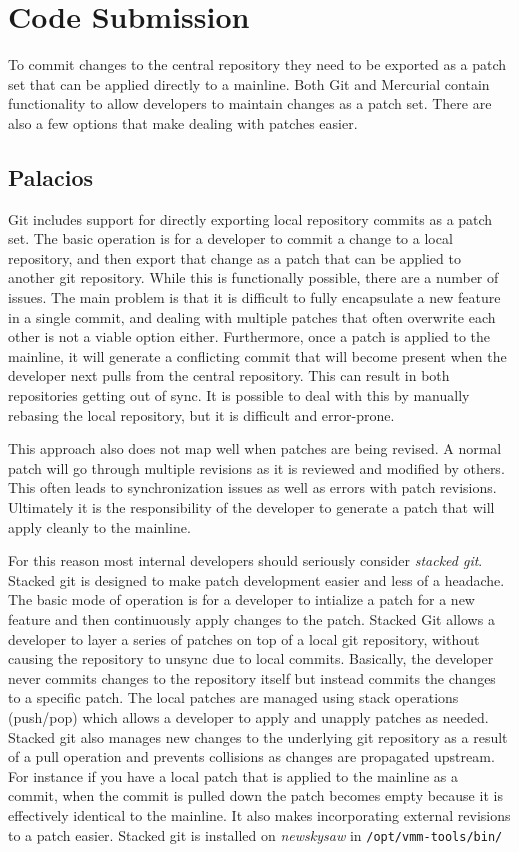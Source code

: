 \documentclass[11pt]{article}
\begin{document}
\section{Code Submission}
\label{sec:submission}

To commit changes to the central repository they need to be exported
as a patch set that can be applied directly to a mainline. Both Git
and Mercurial contain functionality to allow developers to maintain
changes as a patch set. There are also a few options that make dealing
with patches easier.

\subsection{Palacios}

Git includes support for directly exporting local repository commits
as a patch set. The basic operation is for a developer to commit a
change to a local repository, and then export that change as a patch
that can be applied to another git repository. While this is
functionally possible, there are a number of issues. The main problem
is that it is difficult to fully encapsulate a new feature in a single
commit, and dealing with multiple patches that often overwrite each
other is not a viable option either. Furthermore, once a patch is
applied to the mainline, it will generate a conflicting commit that
will become present when the developer next pulls from the central
repository. This can result in both repositories getting out of
sync. It is possible to deal with this by manually rebasing the local
repository, but it is difficult and error-prone. 

This approach also does not map well when patches are being revised. A
normal patch will go through multiple revisions as it is reviewed and
modified by others. This often leads to synchronization issues as well
as errors with patch revisions. Ultimately it is the responsibility of
the developer to generate a patch that will apply cleanly to the
mainline.

For this reason most internal developers should seriously consider
{\em stacked git}. Stacked git is designed to make patch development
easier and less of a headache. The basic mode of operation is for a
developer to intialize a patch for a new feature and then continuously
apply changes to the patch. Stacked Git allows a developer to layer a
series of patches on top of a local git repository, without causing
the repository to unsync due to local commits. Basically, the
developer never commits changes to the repository itself but instead
commits the changes to a specific patch. The local patches are managed
using stack operations (push/pop) which allows a developer to apply
and unapply patches as needed. Stacked git also manages new changes to
the underlying git repository as a result of a pull operation and
prevents collisions as changes are propagated upstream. For instance
if you have a local patch that is applied to the mainline as a commit,
when the commit is pulled down the patch becomes empty because it is
effectively identical to the mainline. It also makes incorporating
external revisions to a patch easier. Stacked git is installed on {\em
newskysaw} in \verb./opt/vmm-tools/bin/. 
\end{document}
